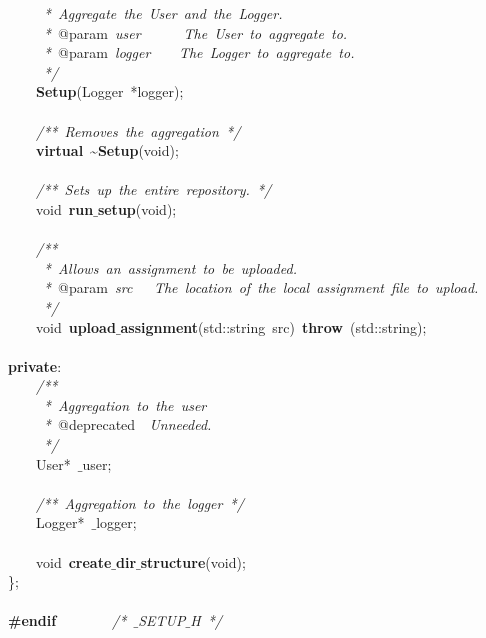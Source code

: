 \mbox{}\textit{\ \ \ \ \ *\ Aggregate\ the\ User\ and\ the\ Logger.} \\
\mbox{}\textit{\ \ \ \ \ *\ }@param\textit{\ user\ \ \ \ \ \ The\ User\ to\ aggregate\ to.} \\
\mbox{}\textit{\ \ \ \ \ *\ }@param\textit{\ logger\ \ \ \ The\ Logger\ to\ aggregate\ to.} \\
\mbox{}\textit{\ \ \ \ \ */} \\
\mbox{}\ \ \ \ \textbf{Setup}(Logger\ *logger); \\
\mbox{} \\
\mbox{}\ \ \ \ \textit{/**\ Removes\ the\ aggregation\ */} \\
\mbox{}\ \ \ \ \textbf{virtual}\ \textasciitilde{}\textbf{Setup}(void); \\
\mbox{} \\
\mbox{}\ \ \ \ \textit{/**\ Sets\ up\ the\ entire\ repository.\ */} \\
\mbox{}\ \ \ \ void\ \textbf{run$\_$setup}(void); \\
\mbox{} \\
\mbox{}\ \ \ \ \textit{/**} \\
\mbox{}\textit{\ \ \ \ \ *\ Allows\ an\ assignment\ to\ be\ uploaded.} \\
\mbox{}\textit{\ \ \ \ \ *\ }@param\textit{\ src\ \ \ The\ location\ of\ the\ local\ assignment\ file\ to\ upload.} \\
\mbox{}\textit{\ \ \ \ \ */} \\
\mbox{}\ \ \ \ void\ \textbf{upload$\_$assignment}(std::string\ src)\ \textbf{throw}\ (std::string); \\
\mbox{} \\
\mbox{}\textbf{private}: \\
\mbox{}\ \ \ \ \textit{/**} \\
\mbox{}\textit{\ \ \ \ \ *\ Aggregation\ to\ the\ user} \\
\mbox{}\textit{\ \ \ \ \ *\ }@deprecated\textit{\ \ Unneeded.} \\
\mbox{}\textit{\ \ \ \ \ */} \\
\mbox{}\ \ \ \ User*\ $\_$user; \\
\mbox{} \\
\mbox{}\ \ \ \ \textit{/**\ Aggregation\ to\ the\ logger\ */} \\
\mbox{}\ \ \ \ Logger*\ $\_$logger; \\
\mbox{} \\
\mbox{}\ \ \ \ void\ \textbf{create$\_$dir$\_$structure}(void); \\
\mbox{}\}; \\
\mbox{} \\
\mbox{}\textbf{\#endif}\ \ \ \ \ \ \ \ \textit{/*\ $\_$SETUP$\_$H\ */} \\
\mbox{} \\

